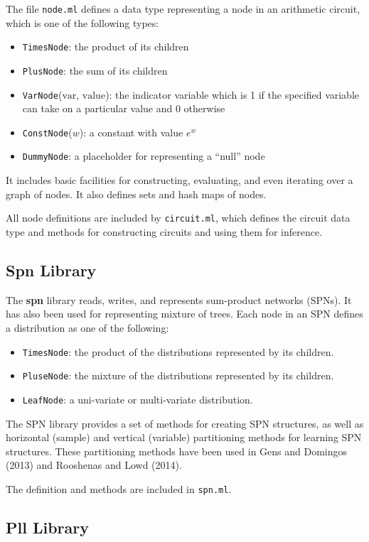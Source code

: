 \documentclass[11pt]{article}
\begin{document}
The file {\tt node.ml} defines a data type representing a
node in an arithmetic circuit, which is one of the following types:
\begin{itemize}
\item {\tt TimesNode}: the product of its children
\item {\tt PlusNode}: the sum of its children
\item {\tt VarNode}($\mbox{var}$, $\mbox{value}$): the indicator variable
which is 1 if the specified variable can take on a particular value and 
0 otherwise
\item {\tt ConstNode}($w$): a constant with value $e^w$
\item {\tt DummyNode}: a placeholder for representing a ``null'' node
\end{itemize}
It includes basic facilities for constructing, evaluating, and even
iterating over a graph of nodes.  It also defines sets and hash maps of
nodes.

All node definitions are included by {\tt circuit.ml}, which defines
the circuit data type and methods for constructing circuits and using
them for inference.

\subsection{Spn Library}

The {\bf spn} library reads, writes, and represents sum-product networks (SPNs). 
It has also been used for representing mixture of trees. 
Each node in an SPN defines a distribution as one of the following:
\begin{itemize}
\item {\tt TimesNode}: the product of the distributions represented by its children.
\item {\tt PluseNode}: the mixture of the distributions represented by its children.
\item {\tt LeafNode}: a uni-variate or multi-variate distribution.
\end{itemize} 
The SPN library provides a set of methods for creating SPN structures, as well as 
horizontal (sample) and vertical (variable) partitioning methods for learning 
SPN structures. These partitioning methods have been used in 
Gens and Domingos (2013) and Rooshenas and Lowd (2014). 

The definition and methods are included in {\tt spn.ml}. 

\subsection{Pll Library}
\end{document}
